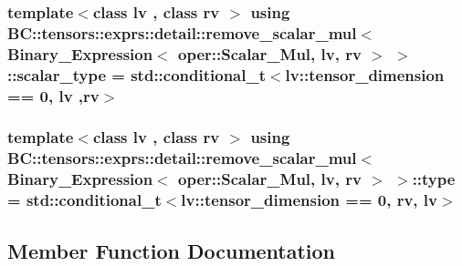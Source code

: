 \subsubsection[{\texorpdfstring{scalar\+\_\+type}{scalar_type}}]{\setlength{\rightskip}{0pt plus 5cm}template$<$class lv , class rv $>$ using {\bf B\+C\+::tensors\+::exprs\+::detail\+::remove\+\_\+scalar\+\_\+mul}$<$ {\bf Binary\+\_\+\+Expression}$<$ {\bf oper\+::\+Scalar\+\_\+\+Mul}, lv, rv $>$ $>$\+::{\bf scalar\+\_\+type} =  std\+::conditional\+\_\+t$<$lv\+::tensor\+\_\+dimension == 0, lv ,rv$>$}\hypertarget{structBC_1_1tensors_1_1exprs_1_1detail_1_1remove__scalar__mul_3_01Binary__Expression_3_01oper_1_93122bdabcd1e75e50e91d14ca138deb_aff94842c2c99bcdf2b3f661f22b6723c}{}\label{structBC_1_1tensors_1_1exprs_1_1detail_1_1remove__scalar__mul_3_01Binary__Expression_3_01oper_1_93122bdabcd1e75e50e91d14ca138deb_aff94842c2c99bcdf2b3f661f22b6723c}
\subsubsection[{\texorpdfstring{type}{type}}]{\setlength{\rightskip}{0pt plus 5cm}template$<$class lv , class rv $>$ using {\bf B\+C\+::tensors\+::exprs\+::detail\+::remove\+\_\+scalar\+\_\+mul}$<$ {\bf Binary\+\_\+\+Expression}$<$ {\bf oper\+::\+Scalar\+\_\+\+Mul}, lv, rv $>$ $>$\+::{\bf type} =  std\+::conditional\+\_\+t$<$lv\+::tensor\+\_\+dimension == 0, rv, lv$>$}\hypertarget{structBC_1_1tensors_1_1exprs_1_1detail_1_1remove__scalar__mul_3_01Binary__Expression_3_01oper_1_93122bdabcd1e75e50e91d14ca138deb_a1a7513162e59b5996ca1dcd668405775}{}\label{structBC_1_1tensors_1_1exprs_1_1detail_1_1remove__scalar__mul_3_01Binary__Expression_3_01oper_1_93122bdabcd1e75e50e91d14ca138deb_a1a7513162e59b5996ca1dcd668405775}


\subsection{Member Function Documentation}
